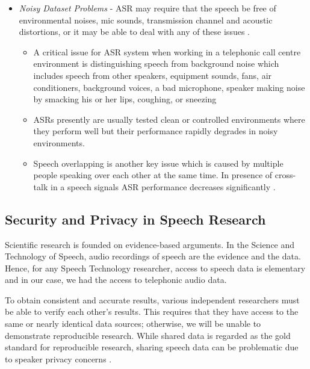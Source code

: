 \begin{itemize}
    \item \textit{Noisy Dataset Problems} - ASR may require that the speech be free of environmental noises, mic sounds, transmission channel and acoustic distortions, or it may be able to deal with any of these issues \cite{schuller_recognition_2009}.
        \begin{itemize}
            \item A critical issue for ASR system when working in a telephonic call centre environment is distinguishing speech from background noise which includes speech from other speakers, equipment sounds, fans, air conditioners, background voices, a bad microphone, speaker making noise by smacking his or her lips, coughing, or sneezing 
            \item ASRs presently are usually tested clean or controlled environments where they perform well but their performance rapidly degrades in noisy environments. 
            \item Speech overlapping is another key issue which is caused by multiple people speaking over each other at the same time. In presence of cross-talk in a speech signals ASR performance decreases significantly \cite{alharbi_automatic_2021}.
        \end{itemize}     
\end{itemize}

\subsection{Security and Privacy in Speech Research}
\label{sub:security_privacy_asr_research}

Scientific research is founded on evidence-based arguments. In the Science and Technology of Speech, audio recordings of speech are the evidence and the data. Hence, for any Speech Technology researcher, access to speech data is elementary and in our case, we had the access to telephonic audio data. 

To obtain consistent and accurate results, various independent researchers must be able to verify each other’s results. This requires that they have access to the same or nearly identical data sources; otherwise, we will be unable to demonstrate reproducible research. While shared data is regarded as the gold standard for reproducible research, sharing speech data can be problematic due to speaker privacy concerns \cite{noauthor_spsc_nodate}.

